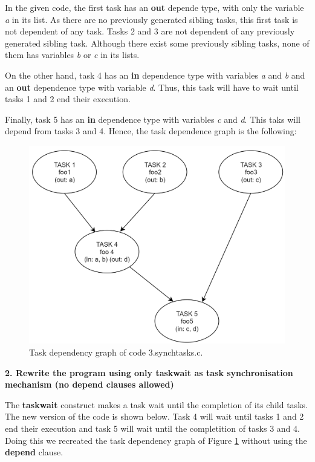 \documentclass[12pt, a4paper]{article}
\begin{document}
In the given code, the first task has an \textbf{out} depende type, with only the variable \textit{a} in its list. As there are no previously generated sibling tasks, this first task is not dependent of any task. Tasks 2 and 3 are not dependent of any previously generated sibling task. Although there exist some previously sibling tasks, none of them has variables \textit{b} or \textit{c} in its lists.

On the other hand, task 4 has an \textbf{in} dependence type with variables \textit{a} and \textit{b} and an \textbf{out} dependence type with variable \textit{d}. Thus, this task will have to wait until tasks 1 and 2 end their execution.

Finally, task 5 has an \textbf{in} dependence type with variables \textit{c} and \textit{d}. This taks will depend from tasks 3 and 4. Hence, the task dependence graph is the following:

\begin{figure}[H]
  \centering
  \includegraphics[scale=0.5]{./images/synchtasks}
  \caption{Task dependency graph of code 3.synchtasks.c.}
  \label{Task dependency graph of code 3.synchtasks.c.}
\end{figure}

\hfill

\textbf{2. Rewrite the program using only taskwait as task synchronisation mechanism (no depend clauses allowed)}

The \textbf{taskwait} construct makes a task wait until the completion of its child tasks. The new version of the code is shown below. Task 4 will wait until tasks 1 and 2 end their execution and task 5 will wait until the completition of tasks 3 and 4. Doing this we recreated the task dependency graph of Figure \ref{Task dependency graph of code 3.synchtasks.c.} without using the \textbf{depend} clause.
\end{document}
